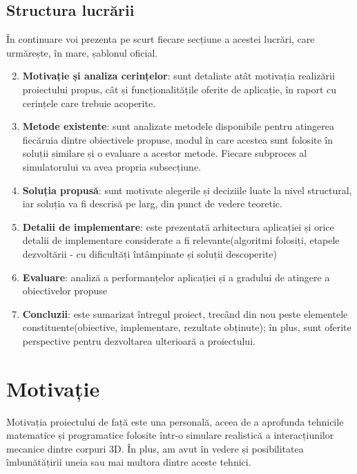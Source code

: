 \documentclass[12pt,a4paper]{report}
\begin{document}
\section{Structura lucrării}
În continuare voi prezenta pe scurt fiecare secțiune a acestei lucrări, care urmărește, în mare, șablonul oficial.
\begin{enumerate}
	\setcounter{enumi}{1}
	\item \textbf{Motivație și analiza cerințelor}: sunt detaliate atât motivația realizării proiectului propus, cât și funcționalitățile oferite de aplicație, în raport cu cerințele care trebuie acoperite.
	\item \textbf{Metode existente}: sunt analizate metodele disponibile pentru atingerea fiecăruia dintre obiectivele propuse, modul în care acestea sunt folosite în soluții similare și o evaluare a acestor metode. Fiecare subproces al simulatorului va avea propria subsecțiune.
	\item \textbf{Soluția propusă}: sunt motivate alegerile și deciziile luate la nivel structural, iar soluția va fi descrisă pe larg, din punct de vedere teoretic.
	\item \textbf{Detalii de implementare}: este prezentată arhitectura aplicației și orice detalii de implementare considerate a fi relevante(algoritmi folosiți, etapele dezvoltării - cu dificultăți întâmpinate și soluții descoperite)
	\item \textbf{Evaluare}: analiză a performanțelor aplicației și a gradului de atingere a obiectivelor propuse
	\item \textbf{Concluzii}: este sumarizat întregul proiect, trecând din nou peste elementele constituente(obiective, implementare, rezultate obținute); în plus, sunt oferite perspective pentru dezvoltarea ulterioară a proiectului.
\end{enumerate}



\chapter{Motivație}
Motivația proiectului de față este una personală, aceea de a aprofunda tehnicile matematice și programatice folosite într-o simulare realistică a interacțiunilor mecanice dintre corpuri 3D. În plus, am avut în vedere și posibilitatea îmbunătățirii uneia sau mai multora dintre aceste tehnici.
\end{document}
